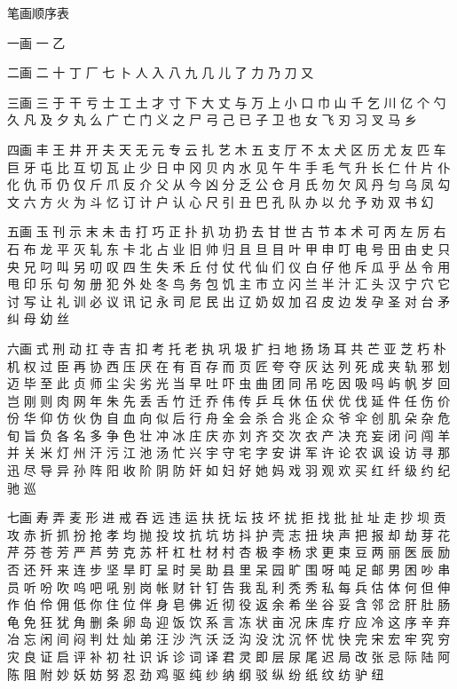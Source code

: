 {笔画顺序表
	
	一画
		一 乙
		
		二画
		二 十 丁 厂 七 卜 人 入 八 九 几 儿 了 力 乃 刀 又
		
		三画
		三 于 干 亏 士 工 土 才 寸 下 大 丈 与 万 上 小 口 巾 山 千 乞 川 亿
		个 勺 久 凡 及 夕 丸 么 广
		亡 门 义 之 尸 弓 己 已 子 卫 也 女 飞 刃 习 叉 马 乡
		
		
		四画
		丰 王 井 开 夫 天 无 元 专 云 扎 艺 木 五 支 厅 不 太 犬 区 历 尤 友
		匹 车 巨 牙 屯 比 互 切 瓦
		止 少 日 中 冈 贝 内 水 见 午 牛 手 毛 气 升 长 仁 什 片 仆 化 仇 币
		仍 仅 斤 爪 反 介 父 从 今
		凶 分 乏 公 仓 月 氏 勿 欠 风 丹 匀 乌 凤 勾 文 六 方 火 为 斗 忆 订
		计 户 认 心 尺 引 丑 巴 孔
		队 办 以 允 予 劝 双 书 幻
		
		五画
		玉 刊 示 末 未 击 打 巧 正 扑 扒 功 扔 去 甘 世 古 节 本 术 可 丙 左
		厉 右 石 布 龙 平 灭 轧 东
		卡 北 占 业 旧 帅 归 且 旦 目 叶 甲 申 叮 电 号 田 由 史 只 央 兄 叼
		叫 另 叨 叹 四 生 失 禾 丘
		付 仗 代 仙 们 仪 白 仔 他 斥 瓜 乎 丛 令 用 甩 印 乐 句 匆 册 犯 外
		处 冬 鸟 务 包 饥 主 市 立
		闪 兰 半 汁 汇 头 汉 宁 穴 它 讨 写 让 礼 训 必 议 讯 记 永 司 尼 民
		出 辽 奶 奴 加 召 皮 边 发
		孕 圣 对 台 矛 纠 母 幼 丝
		
		六画
		式 刑 动 扛 寺 吉 扣 考 托 老 执 巩 圾 扩 扫 地 扬 场 耳 共 芒 亚 芝
		朽 朴 机 权 过 臣 再 协 西
		压 厌 在 有 百 存 而 页 匠 夸 夺 灰 达 列 死 成 夹 轨 邪 划 迈 毕 至
		此 贞 师 尘 尖 劣 光 当 早
		吐 吓 虫 曲 团 同 吊 吃 因 吸 吗 屿 帆 岁 回 岂 刚 则 肉 网 年 朱 先
		丢 舌 竹 迁 乔 伟 传 乒 乓
		休 伍 伏 优 伐 延 件 任 伤 价 份 华 仰 仿 伙 伪 自 血 向 似 后 行 舟
		全 会 杀 合 兆 企 众 爷 伞
		创 肌 朵 杂 危 旬 旨 负 各 名 多 争 色 壮 冲 冰 庄 庆 亦 刘 齐 交 次
		衣 产 决 充 妄 闭 问 闯 羊
		并 关 米 灯 州 汗 污 江 池 汤 忙 兴 宇 守 宅 字 安 讲 军 许 论 农 讽
		设 访 寻 那 迅 尽 导 异 孙
		阵 阳 收 阶 阴 防 奸 如 妇 好 她 妈 戏 羽 观 欢 买 红 纤 级 约 纪 驰
		巡
		
		七画
		寿 弄 麦 形 进 戒 吞 远 违 运 扶 抚 坛 技 坏 扰 拒 找 批 扯 址 走 抄
		坝 贡 攻 赤 折 抓 扮 抢 孝
		均 抛 投 坟 抗 坑 坊 抖 护 壳 志 扭 块 声 把 报 却 劫 芽 花 芹 芬 苍
		芳 严 芦 劳 克 苏 杆 杠 杜
		材 村 杏 极 李 杨 求 更 束 豆 两 丽 医 辰 励 否 还 歼 来 连 步 坚 旱
		盯 呈 时 吴 助 县 里 呆 园
		旷 围 呀 吨 足 邮 男 困 吵 串 员 听 吩 吹 呜 吧 吼 别 岗 帐 财 针 钉
		告 我 乱 利 秃 秀 私 每 兵
		估 体 何 但 伸 作 伯 伶 佣 低 你 住 位 伴 身 皂 佛 近 彻 役 返 余 希
		坐 谷 妥 含 邻 岔 肝 肚 肠
		龟 免 狂 犹 角 删 条 卵 岛 迎 饭 饮 系 言 冻 状 亩 况 床 库 疗 应 冷
		这 序 辛 弃 冶 忘 闲 间 闷
		判 灶 灿 弟 汪 沙 汽 沃 泛 沟 没 沈 沉 怀 忧 快 完 宋 宏 牢 究 穷 灾
		良 证 启 评 补 初 社 识 诉
		诊 词 译 君 灵 即 层 尿 尾 迟 局 改 张 忌 际 陆 阿 陈 阻 附 妙 妖 妨
		努 忍 劲 鸡 驱 纯 纱 纳 纲
		驳 纵 纷 纸 纹 纺 驴 纽
		
}
